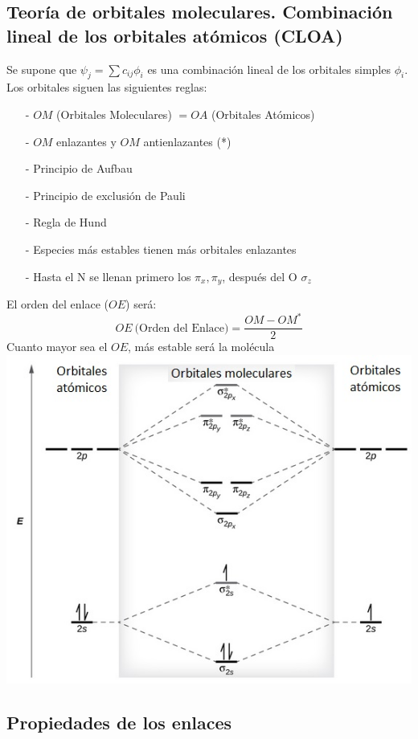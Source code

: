 \documentclass[12pt]{article}
\begin{document}
\subsection{Teoría de orbitales moleculares. Combinación lineal de los orbitales atómicos (CLOA)}
Se supone que $\psi_j=\sum{c_{ij}\phi_i}$ es una combinación lineal de los orbitales simples $\phi_i$.\\
Los orbitales siguen las siguientes reglas:
\begin{itemize}
	\item[-] $OM$ (Orbitales Moleculares) $= OA$ (Orbitales Atómicos)
	\item[-] $OM$ enlazantes y $OM$ antienlazantes (*)
	\item[-] Principio de Aufbau
	\item[-] Principio de exclusión de Pauli
	\item[-] Regla de Hund
	\item[-] Especies más estables tienen más orbitales enlazantes
	\item[-] Hasta el N se llenan primero los $\pi_x, \pi_y$, después del O $\sigma_z$
\end{itemize}
El orden del enlace ($OE$) será:
\[OE \ \text{(Orden del Enlace)} = \frac{OM - OM^*}{2}\]
Cuanto mayor sea el $OE$, más estable será la molécula \\
\includegraphics[scale=0.4]{Orbitales_moleculares}
\subsection{Propiedades de los enlaces}
\end{document}
